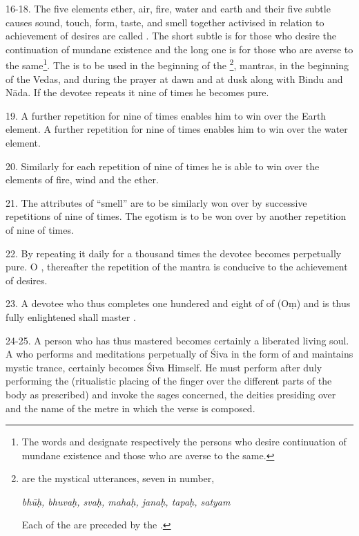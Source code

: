 16-18. The five elements ether, air, fire, water and earth and their five subtle
causes sound, touch, form, taste, and smell together activised in relation to
achievement of desires are called . The short subtle 
is for those who desire the continuation of mundane existence and the long one
is for those who are averse to the same\footnote{The words  and
 designate respectively the persons who desire continuation of
mundane existence and those who are averse to the same.}. The  is to
be used in the beginning of the \footnote{ are
the mystical utterances, seven in number, \viz

\begin{shloka}\itshape
bhūḥ, bhuvaḥ, svaḥ, mahaḥ, janaḥ, tapaḥ, satyam
\end{shloka}

Each of the  are preceded by the .}, mantras, in
the beginning of the Vedas, and during the prayer at dawn and at dusk along with
Bindu and Nāda. If the devotee repeats it nine  of times he becomes
pure.

19. A further repetition for nine  of times enables him to win over
the Earth element. A further repetition for nine  of times enables
him to win over the water element.

20. Similarly for each repetition of nine  of times he is able to win
over the elements of fire, wind and the ether.

21. The attributes of “smell” \etc are to be similarly won over by successive
repetitions of nine  of times. The egotism is to be won over by
another repetition of nine  of times.

22. By repeating it daily for a thousand times the devotee becomes perpetually
pure. O , thereafter the repetition of the mantra is conducive to
the achievement of desires.

23. A devotee who thus completes one hundered and eight  of
 of  (Oṃ) and is thus fully enlightened shall master
.

24-25. A person who has thus mastered  becomes certainly
a liberated living soul. A  who performs  and
meditations perpetually of Śiva in the form of  and maintains mystic
trance, certainly becomes Śiva Himself. He must perform  after duly
performing the  (ritualistic placing of the finger over
the different parts of the body as prescribed) and invoke the sages concerned,
the deities presiding over and the name of the metre in which the verse is
composed.

